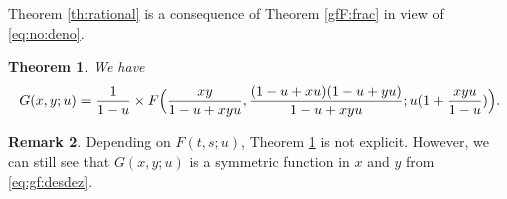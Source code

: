 \documentclass[12pt]{amsart}
\numberwithin{equation}{section}
\theoremstyle{plain}
\newtheorem{theorem}{Theorem}[section]
\theoremstyle{definition}
\newtheorem{remark}[theorem]{Remark}
\begin{document}
Theorem \ref{th:rational} is a consequence of Theorem \ref{gfF:frac} 
in view of \eqref{eq:no:deno}.

\begin{theorem}\label{th:gf:desdez}
	We have
	\begin{equation}\label{eq:gf:desdez}
G(x,y;u)= \frac{1}{1-u} \times F\Bigl(
		\frac{xy}{1-u+xyu}, 
		\frac{(1-u+xu) (1-u+yu)}{1-u+xyu};
		u(1+\frac{xyu}{1-u})\Bigr).
	\end{equation}
\end{theorem}
\begin{remark} Depending on $F(t,s;u)$, Theorem \ref{th:gf:desdez} is not explicit. However, we can still see that $G(x,y;u)$ is a symmetric function in $x$ and $y$ from \eqref{eq:gf:desdez}. 
\end{remark}
\end{document}
